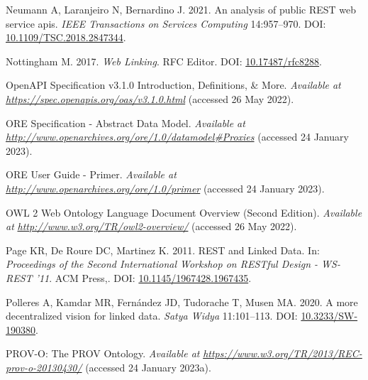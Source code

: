 \begin{CSLReferences}{1}{0}
\leavevmode{}%
Neumann A, Laranjeiro N, Bernardino J. 2021. An analysis of public REST web service apis. \emph{IEEE Transactions on Services Computing} 14:957--970. DOI: \href{https://doi.org/10.1109/TSC.2018.2847344}{10.1109/TSC.2018.2847344}.

\leavevmode{}%
Nottingham M. 2017. \emph{Web Linking}. RFC Editor. DOI: \href{https://doi.org/10.17487/rfc8288}{10.17487/rfc8288}.

\leavevmode{}%
OpenAPI Specification v3.1.0 \textbar{} Introduction, Definitions, \& More. \emph{Available at} \href{https://spec.openapis.org/oas/v3.1.0.html}{\emph{https://spec.openapis.org/oas/v3.1.0.html}} (accessed 26 May 2022).

\leavevmode{}%
ORE Specification - Abstract Data Model. \emph{Available at} \href{http://www.openarchives.org/ore/1.0/datamodel\#Proxies}{\emph{http://www.openarchives.org/ore/1.0/datamodel\#Proxies}} (accessed 24 January 2023).

\leavevmode{}%
ORE User Guide - Primer. \emph{Available at} \href{http://www.openarchives.org/ore/1.0/primer}{\emph{http://www.openarchives.org/ore/1.0/primer}} (accessed 24 January 2023).

\leavevmode{}%
OWL 2 Web Ontology Language Document Overview (Second Edition). \emph{Available at} \href{http://www.w3.org/TR/owl2-overview/}{\emph{http://www.w3.org/TR/owl2-overview/}} (accessed 26 May 2022).

\leavevmode{}%
Page KR, De Roure DC, Martinez K. 2011. REST and Linked Data. In: \emph{Proceedings of the Second International Workshop on RESTful Design - WS-REST '11}. ACM Press,. DOI: \href{https://doi.org/10.1145/1967428.1967435}{10.1145/1967428.1967435}.

\leavevmode{}%
Polleres A, Kamdar MR, Fernández JD, Tudorache T, Musen MA. 2020. A more decentralized vision for linked data. \emph{Satya Widya} 11:101--113. DOI: \href{https://doi.org/10.3233/SW-190380}{10.3233/SW-190380}.

\leavevmode{}%
PROV-O: The PROV Ontology. \emph{Available at} \href{https://www.w3.org/TR/2013/REC-prov-o-20130430/}{\emph{https://www.w3.org/TR/2013/REC-prov-o-20130430/}} (accessed 24 January 2023a).


\end{CSLReferences}
